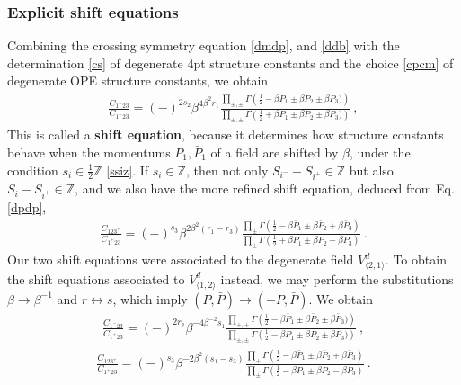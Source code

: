 \documentclass[12pt, a4paper]{article}
\newcommand{\myindex}[1]{\textbf{\boldmath #1}}
\theoremstyle{break}
\begin{document}
\subsubsection{Explicit shift equations}

Combining the crossing symmetry equation \eqref{dmdp}, and \eqref{ddb} with the determination \eqref{cs} of degenerate 4pt structure constants and the choice \eqref{cpcm} of degenerate OPE structure constants, we obtain
\begin{align}
 \boxed{\frac{C_{1^-23}}{C_{1^+23}} = 
 (-)^{2s_2}\beta^{4\beta^2r_1} \frac{\prod_{\pm,\pm}\Gamma\left(\tfrac12 -\beta\bar P_1\pm\beta \bar P_2\pm\beta \bar P_3)\right)}{\prod_{\pm,\pm}
 \Gamma\left(\tfrac12 +\beta P_1\pm \beta P_2\pm\beta P_3)\right)}} \ ,
 \label{sh-mp}
\end{align}
This is called a \myindex{shift equation}, because it determines how structure constants behave when the momentums $P_1,\bar P_1$ of a field are shifted by $\beta$, under the condition $s_i\in \frac12 \mathbb{Z}$ \eqref{ssiz}. If $s_i\in\mathbb{Z}$, then not only $S_{i^-}-S_{i^+}\in\mathbb{Z}$ but also $S_{i}-S_{i^+}\in\mathbb{Z}$, and we also have the more refined shift equation, deduced from Eq. \eqref{dpdp},
\begin{align}
 \boxed{\frac{C_{123^+}}{C_{1^+23}} = 
 (-)^{s_3} \beta^{2\beta^2(r_1-r_3)}
 \frac{ \prod_\pm\Gamma\left(\frac12 -\beta\bar P_1 \pm \beta\bar P_2 +\beta\bar P_3\right)}{ \prod_\pm\Gamma\left(\frac12+\beta P_1 \pm \beta P_2 -\beta P_3\right)}}\ .
 \label{sh-pp}
\end{align}
Our two shift equations were associated to the degenerate field $V^d_{\langle 2,1\rangle}$. To obtain the shift equations associated to $V^d_{\langle 1,2\rangle}$ instead, we may perform the substitutions $\beta\to \beta^{-1}$ and $r\leftrightarrow s$, which imply $(P,\bar P)\to (-P,\bar P)$. We obtain 
\begin{align}
 \frac{C_{1^-23}}{C_{1^+23}} = 
 (-)^{2r_2}\beta^{-4\beta^{-2}s_1} \frac{\prod_{\pm,\pm}\Gamma\left(\tfrac12 -\beta\bar P_1\pm\beta \bar P_2\pm\beta \bar P_3)\right)}{\prod_{\pm,\pm}
 \Gamma\left(\tfrac12 -\beta P_1\pm \beta P_2\pm\beta P_3)\right)} \ ,
 \label{sh-mp2}
\end{align}
\begin{align}
\frac{C_{123^+}}{C_{1^+23}} = 
 (-)^{s_3} \beta^{-2\beta^2(s_1-s_3)}
 \frac{ \prod_\pm\Gamma\left(\frac12 -\beta\bar P_1 \pm \beta\bar P_2 +\beta\bar P_3\right)}{ \prod_\pm\Gamma\left(\frac12-\beta P_1 \pm \beta P_2 -\beta P_3\right)}\ .
 \label{sh-pp2}
\end{align}
\end{document}
